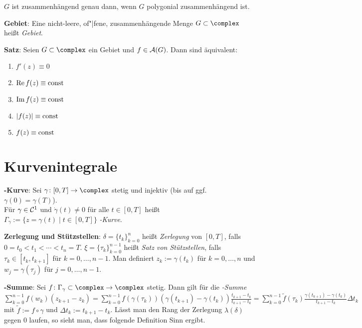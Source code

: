 $G$ ist zusammenhängend genau dann, wenn $G$ polygonial zusammenhängend ist.

\linie

\textbf{Gebiet}:
Eine nicht-leere, of"|fene, zusammenhängende Menge $G \subset \complex$ heißt
\emph{Gebiet}.

\linie

\textbf{Satz}:
Seien $G \subset \complex$ ein Gebiet und $f \in \mathcal{A}(G)$.
Dann sind äquivalent:
\begin{enumerate}
    \item
    $f'(z) \equiv 0$

    \item
    $\operatorname{Re} f(z) \equiv \operatorname{const}$

    \item
    $\operatorname{Im} f(z) \equiv \operatorname{const}$

    \item
    $|f(z)| \equiv \operatorname{const}$

    \item

    $f(z) \equiv \operatorname{const}$
\end{enumerate}

\section{%
    Kurvenintegrale%
}

\textbf{-Kurve}:
Sei $\gamma\colon [0, T] \rightarrow \complex$ stetig und injektiv
(bis auf ggf. $\gamma(0) = \gamma(T)$).\\
Für $\gamma \in \mathcal{C}^1$ und $\dot{\gamma}(t) \not= 0$ für alle $t \in [0, T]$
heißt $\Gamma_\gamma := \{z = \gamma(t) \;|\; t \in [0, T]\}$
\emph{-Kurve}.

\textbf{Zerlegung und Stützstellen}:
$\delta = \{t_k\}_{k=0}^n$ heißt \emph{Zerlegung} von $[0, T]$, falls\\
$0 = t_0 < t_1 < \dotsb < t_n = T$.
$\xi = \{\tau_k\}_{k=0}^{n-1}$ heißt \emph{Satz von Stützstellen}, falls
$\tau_k \in [t_k, t_{k+1}]$ für $k = 0, \dotsc, n - 1$.
Man definiert $z_k := \gamma(t_k)$ für $k = 0, \dotsc, n$ und
$w_j = \gamma(\tau_j)$ für $j = 0, \dotsc, n - 1$.

\textbf{-Summe}:
Sei $f\colon \Gamma_\gamma \subset \complex \rightarrow \complex$ stetig.
Dann gilt für die \emph{-Summe}\\
$\sum_{k=0}^{n-1} f(w_k) (z_{k+1} - z_k)
= \sum_{k=0}^{n-1} f(\gamma(\tau_k)) (\gamma(t_{k+1}) - \gamma(t_k))
\frac{t_{k+1} - t_k}{t_{k+1} - t_k}
= \sum_{k=0}^{n-1} \widetilde{f}(\tau_k)
\frac{\gamma(t_{k+1}) - \gamma(t_k)}{t_{k+1} - t_k} \Delta t_k$\\
mit $\widetilde{f} := f \circ \gamma$ und $\Delta t_k := t_{k+1} - t_k$.
Lässt man den Rang der Zerlegung $\lambda(\delta)$ gegen $0$ laufen, so sieht
man, dass folgende Definition Sinn ergibt.

